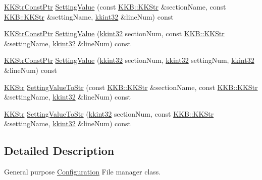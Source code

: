 \begin{DoxyCompactItemize}
\hyperlink{namespace_k_k_b_a46f665ec17615c856eff3d21f78bed5c}{K\+K\+Str\+Const\+Ptr} \hyperlink{class_k_k_b_1_1_configuration_a3ec669dec9c7fa4c1a350d3582d49b46}{Setting\+Value} (const \hyperlink{class_k_k_b_1_1_k_k_str}{K\+K\+B\+::\+K\+K\+Str} \&section\+Name, const \hyperlink{class_k_k_b_1_1_k_k_str}{K\+K\+B\+::\+K\+K\+Str} \&setting\+Name, \hyperlink{namespace_k_k_b_a8fa4952cc84fda1de4bec1fbdd8d5b1b}{kkint32} \&line\+Num) const 
\item 
\hyperlink{namespace_k_k_b_a46f665ec17615c856eff3d21f78bed5c}{K\+K\+Str\+Const\+Ptr} \hyperlink{class_k_k_b_1_1_configuration_a9316bf174af1824baa4f1f6f1816cb55}{Setting\+Value} (\hyperlink{namespace_k_k_b_a8fa4952cc84fda1de4bec1fbdd8d5b1b}{kkint32} section\+Num, const \hyperlink{class_k_k_b_1_1_k_k_str}{K\+K\+B\+::\+K\+K\+Str} \&setting\+Name, \hyperlink{namespace_k_k_b_a8fa4952cc84fda1de4bec1fbdd8d5b1b}{kkint32} \&line\+Num) const 
\item 
\hyperlink{namespace_k_k_b_a46f665ec17615c856eff3d21f78bed5c}{K\+K\+Str\+Const\+Ptr} \hyperlink{class_k_k_b_1_1_configuration_a5c7fc0c7b4a7f695105fb05d482b73be}{Setting\+Value} (\hyperlink{namespace_k_k_b_a8fa4952cc84fda1de4bec1fbdd8d5b1b}{kkint32} section\+Num, \hyperlink{namespace_k_k_b_a8fa4952cc84fda1de4bec1fbdd8d5b1b}{kkint32} setting\+Num, \hyperlink{namespace_k_k_b_a8fa4952cc84fda1de4bec1fbdd8d5b1b}{kkint32} \&line\+Num) const 
\item 
\hyperlink{class_k_k_b_1_1_k_k_str}{K\+K\+Str} \hyperlink{class_k_k_b_1_1_configuration_ae422231ca6ffc64d6790f1a1ab8a48a7}{Setting\+Value\+To\+Str} (const \hyperlink{class_k_k_b_1_1_k_k_str}{K\+K\+B\+::\+K\+K\+Str} \&section\+Name, const \hyperlink{class_k_k_b_1_1_k_k_str}{K\+K\+B\+::\+K\+K\+Str} \&setting\+Name, \hyperlink{namespace_k_k_b_a8fa4952cc84fda1de4bec1fbdd8d5b1b}{kkint32} \&line\+Num) const 
\item 
\hyperlink{class_k_k_b_1_1_k_k_str}{K\+K\+Str} \hyperlink{class_k_k_b_1_1_configuration_ac94b40f7c7fda89736003a7c0effabb6}{Setting\+Value\+To\+Str} (\hyperlink{namespace_k_k_b_a8fa4952cc84fda1de4bec1fbdd8d5b1b}{kkint32} section\+Num, const \hyperlink{class_k_k_b_1_1_k_k_str}{K\+K\+B\+::\+K\+K\+Str} \&setting\+Name, \hyperlink{namespace_k_k_b_a8fa4952cc84fda1de4bec1fbdd8d5b1b}{kkint32} \&line\+Num) const 
\end{DoxyCompactItemize}


\subsection{Detailed Description}
General purpose \hyperlink{class_k_k_b_1_1_configuration}{Configuration} File manager class. 

